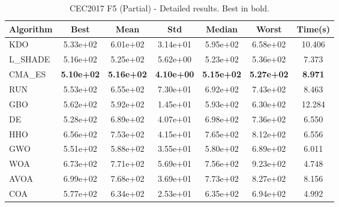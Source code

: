 \begin{table}[H]
\centering\small
\caption{CEC2017 F5 (Partial) - Detailed results. Best in bold.}
\label{tab:cec2017_F5}
\begin{tabular}{lcccccc}
\toprule
\textbf{Algorithm} & \textbf{Best} & \textbf{Mean} & \textbf{Std} & \textbf{Median} & \textbf{Worst} & \textbf{Time(s)} \\
\midrule
KDO & 5.33e+02 & 6.01e+02 & 3.14e+01 & 5.95e+02 & 6.58e+02 & 10.406 \\
L_SHADE & 5.16e+02 & 5.25e+02 & 5.62e+00 & 5.23e+02 & 5.36e+02 & 7.373 \\
CMA_ES & \textbf{5.10e+02} & \textbf{5.16e+02} & \textbf{4.10e+00} & \textbf{5.15e+02} & \textbf{5.27e+02} & \textbf{8.971} \\
RUN & 5.53e+02 & 6.55e+02 & 7.30e+01 & 6.92e+02 & 7.43e+02 & 8.463 \\
GBO & 5.62e+02 & 5.92e+02 & 1.45e+01 & 5.93e+02 & 6.30e+02 & 12.284 \\
DE & 5.28e+02 & 6.89e+02 & 4.07e+01 & 6.98e+02 & 7.36e+02 & 6.550 \\
HHO & 6.56e+02 & 7.53e+02 & 4.15e+01 & 7.65e+02 & 8.12e+02 & 6.556 \\
GWO & 5.51e+02 & 5.88e+02 & 3.55e+01 & 5.80e+02 & 6.89e+02 & 6.011 \\
WOA & 6.73e+02 & 7.71e+02 & 5.69e+01 & 7.56e+02 & 9.23e+02 & 4.748 \\
AVOA & 6.99e+02 & 7.68e+02 & 3.69e+01 & 7.73e+02 & 8.27e+02 & 8.156 \\
COA & 5.77e+02 & 6.34e+02 & 2.53e+01 & 6.35e+02 & 6.94e+02 & 4.992 \\
\bottomrule
\end{tabular}
\end{table}
